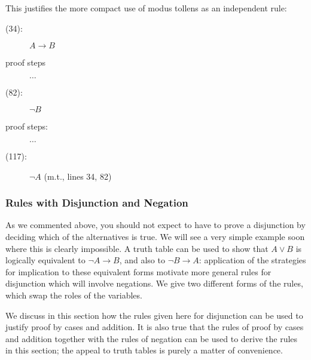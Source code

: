 \documentclass[12pt]{article}
\begin{document}
This justifies the more compact use of modus tollens as an independent rule:

\begin{description}

\item[(34):]  $A \rightarrow B$

\item[proof steps] $\ldots$

\item [(82):] $\neg B$

\item [proof steps:]  $\ldots$

\item[(117):]  $\neg A$ (m.t., lines 34, 82)

\end{description}





\subsubsection{Rules with Disjunction and Negation}


As we commented above, you should not expect to have to prove a disjunction by deciding which of the alternatives is true.  We will see a very simple example soon where this is clearly impossible.  A truth table can be used to show that 
$A \vee B$ is logically equivalent to $\neg A \rightarrow B$, and also to $\neg B \rightarrow A$:  application of the strategies for implication to these equivalent forms motivate more general rules for disjunction
which will involve negations.  We give two different forms of the rules, which swap the roles of the variables.

We discuss in this section how the rules given here for disjunction can be used to justify proof by cases and addition.  It is also true that the rules of proof by cases and addition together with the rules of negation can be used to derive the rules in this section; the appeal to truth tables is purely a matter of convenience.

\end{document}
